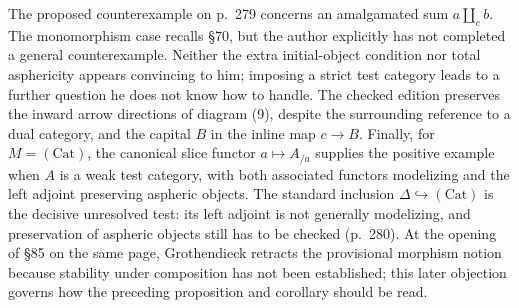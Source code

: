 The proposed counterexample on p.\ 279 concerns an amalgamated sum $a\amalg_c b$. The monomorphism case recalls \S70, but the author explicitly has not completed a general counterexample. Neither the extra initial-object condition nor total asphericity appears convincing to him; imposing a strict test category leads to a further question he does not know how to handle. The checked edition preserves the inward arrow directions of diagram (9), despite the surrounding reference to a dual category, and the capital $B$ in the inline map $c\to B$. Finally, for $M=(\mathrm{Cat})$, the canonical slice functor $a\mapsto A_{/a}$ supplies the positive example when $A$ is a weak test category, with both associated functors modelizing and the left adjoint preserving aspheric objects. The standard inclusion $\Delta\hookrightarrow(\mathrm{Cat})$ is the decisive unresolved test: its left adjoint is not generally modelizing, and preservation of aspheric objects still has to be checked (p.\ 280). At the opening of \S85 on the same page, Grothendieck retracts the provisional morphism notion because stability under composition has not been established; this later objection governs how the preceding proposition and corollary should be read.

